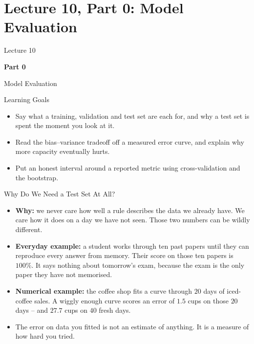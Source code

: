 \section{Lecture 10, Part 0: Model Evaluation}

\begin{frame}
\vfill
\centering
{\color{RLBlue}\large Lecture 10}

\vspace{0.3em}
{\color{RLBlue}\Large\bfseries Part 0}

\vspace{0.6em}
{\Large Model Evaluation}
\vfill
\end{frame}

\begin{frame}{Learning Goals}
\begin{itemize}
  \item Say what a training, validation and test set are each for, and why a test set is spent the moment you look at it.
  \pause
  \item Read the bias--variance tradeoff off a measured error curve, and explain why more capacity eventually hurts.
  \pause
  \item Put an honest interval around a reported metric using cross-validation and the bootstrap.
\end{itemize}
\end{frame}

\begin{frame}{Why Do We Need a Test Set At All?}
\begin{itemize}
  \item \textbf{Why:} we never care how well a rule describes the data we already have. We care how it does on a day we have not seen. Those two numbers can be wildly different.
  \pause
  \item \textbf{Everyday example:} a student works through ten past papers until they can reproduce every answer from memory. Their score on those ten papers is $100\%$. It says nothing about tomorrow's exam, because the exam is the only paper they have not memorised.
  \pause
  \item \textbf{Numerical example:} the coffee shop fits a curve through $20$ days of iced-coffee sales. A wiggly enough curve scores an error of $1.5$ cups on those $20$ days -- and $27.7$ cups on $40$ fresh days.
  \pause
  \item The error on data you fitted is not an estimate of anything. It is a measure of how hard you tried.
\end{itemize}
\end{frame}

